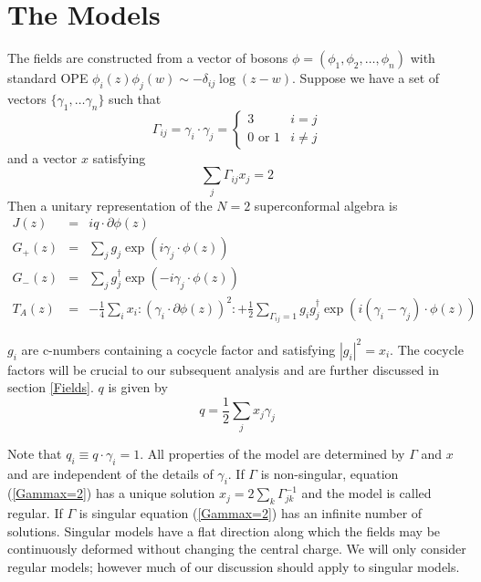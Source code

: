 \documentclass[a4paper,a4paper]{article}
\begin{document}
\section{The Models}
\label{sec:model}

The fields are constructed from a vector of bosons $\phi = (\phi_1, \phi_2, \ldots, \phi_n)$ with
standard OPE $\phi_i(z) \phi_j(w) \sim -\delta_{ij} \log(z - w)$. Suppose we have a set of
vectors $\{\gamma_1, \ldots \gamma_n \}$ such that 
\begin{equation}
\Gamma_{ij} = \gamma_i \cdot \gamma_j =  \left\{ \begin{array}{ll} 3 & i=j \\ 0 \textrm{ or } 1 & i \ne j \end{array} \right.
\end{equation}
and a vector $x$ satisfying
\begin{equation}
\label{Gammax=2}
\sum_j \Gamma_{ij}x_{j} = 2
\end{equation}
Then a unitary representation of the $N=2$ superconformal algebra is \cite{Kazama2}
\begin{eqnarray}
\label{qnumber}
J(z) &  = & iq\cdot\partial\phi(z) \\ 
G_{+}(z) & = & \sum_j g_j \exp(i\gamma_j \cdot \phi(z)) \\
G_{-}(z) & = & \sum_j g_j^{\dagger} \exp(-i\gamma_j \cdot \phi(z)) \\
T_A(z) & = & -\frac{1}{4} \sum_i x_i : ( \gamma_i \cdot \partial\phi(z) ) ^2 : + \frac{1}{2} \sum_{\Gamma_{ij}=1} g_i g_j^{\dagger} 
\exp\left(i(\gamma_i - \gamma_j)\cdot\phi(z)\right)
\label{stressT}
\end{eqnarray}

$g_i$ are c-numbers containing a cocycle factor and satisfying $|g_i|^2 = x_i$.
The cocycle factors will be crucial to our subsequent analysis and are further discussed in section \ref{Fields}.
$q$ is given by
\begin{equation}
q = \frac{1}{2} \sum_j x_j \gamma_j
\end{equation}

Note that $q_i \equiv q\cdot\gamma_i = 1$. All properties of the model are determined by $\Gamma$ and $x$
and are independent of the details of $\gamma_i$.  If $\Gamma$ is non-singular, equation (\ref{Gammax=2}) has a unique solution
$x_j = 2 \sum_k \Gamma_{jk}^{-1}$ and the model is called regular. 
If $\Gamma$ is singular equation (\ref{Gammax=2}) has an infinite number of solutions. Singular models
have a flat direction along which the fields may be continuously deformed without
changing the central charge.
We will only consider regular models; however much of our discussion should apply to singular models.
\end{document}

